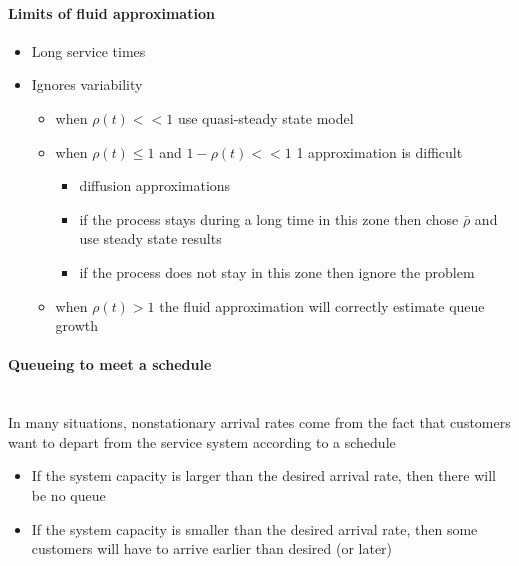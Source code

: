 \documentclass[paper=a4,fontsize=8pt,pagesize,DIV=calc]{scrartcl}
\newcounter{row}
\begin{document}
\begin{multicols}{3}
\paragraph{Limits of fluid approximation}
\begin{itemize}
\item Long service times
\item Ignores variability
\begin{itemize}
\item when $\rho(t) << 1$ use quasi-steady state model
\item when $\rho(t) \leq  1$ and $1-\rho(t)<<1$ 1 approximation is difficult
\begin{itemize}
\item diffusion approximations
\item if the process stays during a long time in this zone then chose $\bar{\rho}$ and use steady state results
\item if the process does not stay in this zone then ignore the problem
\end{itemize}
\item when $\rho(t) > 1$ the fluid approximation will correctly estimate queue growth
\end{itemize}
\end{itemize}
\paragraph{Queueing to meet a schedule}~~\\
In many situations, nonstationary arrival rates come from the fact that customers want to depart from the service system according to a schedule
\begin{itemize}
\item If the system capacity is larger than the desired arrival rate, then there will be no queue
\item If the system capacity is smaller than the desired arrival rate, then some customers will have to arrive earlier than desired (or later)
\end{itemize}

\end{multicols}
\end{document}

